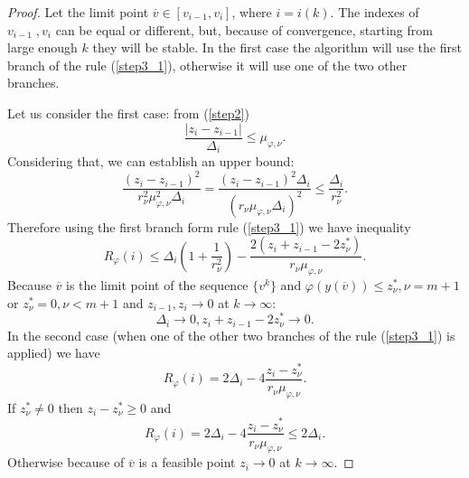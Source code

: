 \documentclass[runningheads]{llncs}
\begin{document}
\begin{proof}
  Let the limit point \(\overline{v}\in [v_{i-1},v_i]\), where \(i=i(k)\). The indexes of \(v_{i-1}\;,v_i\)
  can be equal or different, but, because of convergence, starting from large enough \(k\) they will be stable.
  In the first case the algorithm will use the first branch of the rule (\ref{step3_1}), otherwise it will use
  one of the two other branches.

  Let us consider the first case: from (\ref{step2})
  \begin{displaymath}
    \frac{|z_i-z_{i-1}|}{\Delta_i} \leqslant \mu_{\varphi,\nu}.
  \end{displaymath}
  Considering that, we can establish an upper bound:
  \begin{displaymath}
    \frac{(z_i-z_{i-1})^2}{r_\nu^2\mu_{\varphi,\nu}^2\Delta_i}=\frac{(z_i-z_{i-1})^2\Delta_i}{(r_\nu\mu_{\varphi,\nu}\Delta_i)^2}
    \leqslant \frac{\Delta_i}{r_\nu^2}.
  \end{displaymath}
  Therefore using the first branch form rule (\ref{step3_1}) we have inequality
  \begin{equation}
    \label{eq:th1}
    R_\varphi(i)\leqslant\Delta_i(1 + \frac{1}{r_\nu^2}) - \frac{2(z_i+z_{i-1}-2z^*_\nu)}{r_\nu\mu_{\varphi,\nu}}.
  \end{equation}
  Because \(\overline{v}\) is the limit point of the sequence \(\{v^k\}\) and \(\varphi(y(\overline{v}))\leqslant z^*_{\nu}, \nu=m+1\) or
  \(z^*_\nu=0, \nu<m+1\) and \(z_{i-1},z_i\to 0\) at \(k\to\infty\):
  \begin{equation}
    \label{eq:th2}
    \Delta_i\to 0, z_i+z_{i-1} - 2 z_\nu^*\to 0.
  \end{equation}
  In the second case (when one of the other two branches of the rule (\ref{step3_1}) is applied) we have
  \begin{displaymath}
    R_\varphi(i)=2\Delta_i - 4\frac{z_i-z^*_\nu}{r_\nu\mu_{\varphi,\nu}}.
  \end{displaymath}
  If \(z^*_\nu \ne 0\) then \(z_i-z^*_\nu \geqslant 0\) and
  \begin{equation}
    \label{eq:th3}
    R_\varphi(i)=2\Delta_i - 4\frac{z_i-z^*_\nu}{r_\nu\mu_{\varphi,\nu}} \leqslant 2\Delta_i.
  \end{equation}
  Otherwise because of \(\overline{v}\) is a feasible point \(z_i\to 0\) at \(k\to\infty\).


\end{proof}
\end{document}
